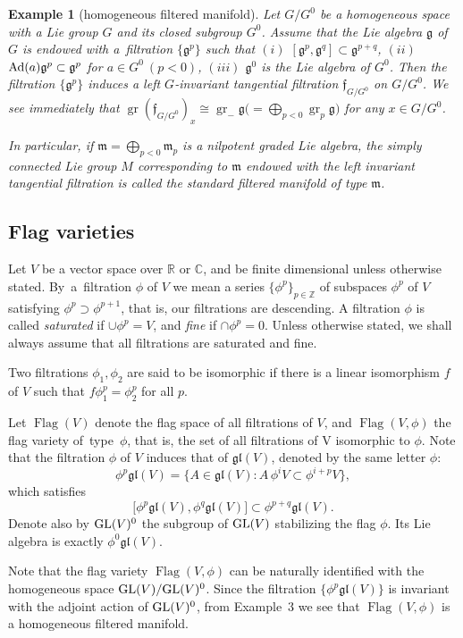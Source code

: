 \documentclass[10pt,a4paper]{amsart}
\newcommand{\R}{\mathbb R}
\newcommand{\Z}{\mathbb Z}
\newcommand{\C}{\mathbb C}
\newcommand{\f}{\mathfrak f}
\newcommand{\g}{\mathfrak g}
\newcommand{\gl}{\mathfrak{gl}}
\newcommand{\m}{\mathfrak m}
\newcommand{\Flag}{\operatorname{Flag}}
\newcommand{\gr}{\operatorname{gr}}
\newtheorem{ex}[thm]{Example}
\numberwithin{equation}{section}
\begin{document}
\begin{ex} [homogeneous filtered manifold]
Let $G/G^0$ be a homogeneous space with a Lie group $G$ and its closed subgroup $G^0$.
Assume that the Lie algebra $\g$ of $G$ is endowed with a~filtration $\{ \g^p\}$
such that $(i)$ $[\g^p,\g^q]\subset \g^{p+q}$, $(ii)$ ${\rm Ad}(a)\g^p\subset \g^p$ for
$a\in G^0\ (p<0)$, $(iii)$ $\g^0$ is the Lie algebra of $G^0$.
Then the filtration $\{ \g^p\}$ induces a left $G$-invariant tangential filtration
$\f_{G/G^0}$ on $G/G^0$.
We see immediately that $\gr(\f_{G/G^0})_x\cong \gr_-\g \big({}=\bigoplus_{p<0}\gr_p\g\big)$
for any $x\in G/G^0$.

In particular, if $\m=\bigoplus_{p<0} \m_p$ is a nilpotent graded Lie algebra,
the simply connected Lie group $M$ corresponding to $\m$ endowed with the
left invariant tangential filtration is called the \emph{standard filtered manifold of type $\m$}.
\end{ex}

\subsection{Flag varieties}

Let $V$ be a vector space over $\R$ or $\C$, and be finite dimensional
unless otherwise stated.
By~a~fil\-t\-ration $\phi$ of $V$ we mean a series $\{ \phi ^p\} _{p \in \Z} $ of
subspaces $ \phi^p$ of $V$ satisfying $\phi^p \supset \phi^{p+1} $, that is, our filtrations are descending. A filtration $\phi$ is called \emph{saturated} if $\cup \phi^p = V$,
and \emph{fine} if $\cap \phi^p = 0$.
Unless otherwise stated, we shall always assume that all filtrations are saturated and fine.

Two filtrations $\phi_1, \phi_2$ are said to be isomorphic if
there is a linear isomorphism $f$ of $V$ such that
$f\phi_1^p = \phi_2^p $ for all $p$.

Let $\Flag(V) $ denote the flag space of all filtrations of $V$, and $\Flag(V, \phi)$ the flag variety of~type~$\phi$, that is, the set of all filtrations of V isomorphic to $\phi$. Note that the filtration $\phi$ of $V$ induces that of $\gl(V)$, denoted by the same letter $\phi$:
\[
\phi^p\gl(V) = \big\{ A \in \gl(V) \colon A\,\phi^iV \subset \phi^{i+p} V \big\},
\]
which satisfies
\[
\big[ \phi^p\gl(V), \phi^q\gl(V) \big] \subset \phi^{p+q}\gl(V).
\]
Denote also by ${\rm GL}(V)^0$ the subgroup of ${\rm GL}(V)$ stabilizing the flag $\phi$. Its Lie algebra is exactly $\phi^0\gl(V)$.

Note that the flag variety $\Flag(V,\phi)$ can be naturally identified with the homogeneous space ${\rm GL}(V)/{\rm GL}(V)^0$. Since the filtration $\{\phi^p\gl(V)\}$ is invariant with the adjoint action of ${\rm GL}(V)^0$, from Example~3 we see that $\Flag(V,\phi)$ is a homogeneous filtered manifold.
\end{document}
